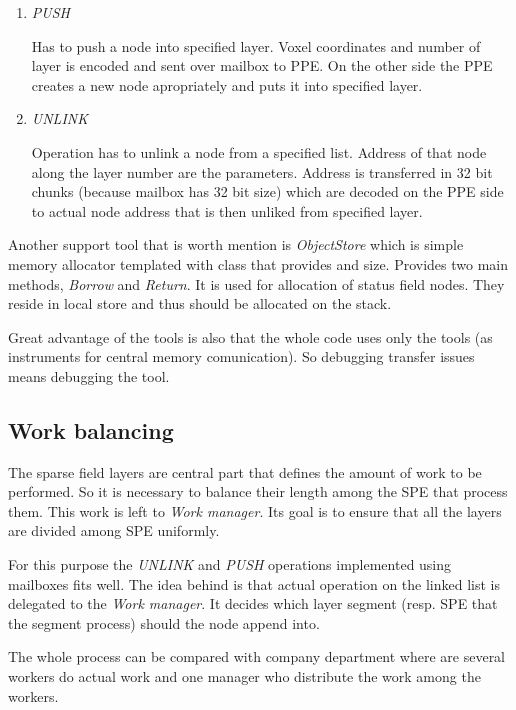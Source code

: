 \begin{enumerate}
\item \emph{PUSH}
\par
Has to push a node into specified layer.
Voxel coordinates and number of layer is encoded and sent over mailbox to PPE.
On the other side the PPE creates a new node apropriately and puts it into specified layer.

\item \emph{UNLINK}
\par
Operation has to unlink a node from a specified list.
Address of that node along the layer number are the parameters.
Address is transferred in 32 bit chunks (because mailbox has 32 bit size) which are decoded on the PPE side to actual node address that is then unliked from specified layer.
\end{enumerate}

\par
Another support tool that is worth mention is \emph{ObjectStore} which is simple memory allocator templated with class that provides and size.
Provides two main methods, \emph{Borrow} and \emph{Return}.
It is used for allocation of status field nodes.
They reside in local store and thus should be allocated on the stack.

\par
Great advantage of the tools is also that the whole code uses only the tools (as instruments for central memory comunication).
So debugging transfer issues means debugging the tool.

\subsection{Work balancing}

\par
The sparse field layers are central part that defines the amount of work to be performed.
So it is necessary to balance their length among the SPE that process them.
This work is left to \emph{Work manager}.
Its goal is to ensure that all the layers are divided among SPE uniformly.

\par
For this purpose the \emph{UNLINK} and \emph{PUSH} operations implemented using mailboxes fits well.
The idea behind is that actual operation on the linked list is delegated to the \emph{Work manager}.
It decides which layer segment (resp. SPE that the segment process) should the node append into.

\par
The whole process can be compared with company department where are several workers do actual work and one manager who distribute the work among the workers.

